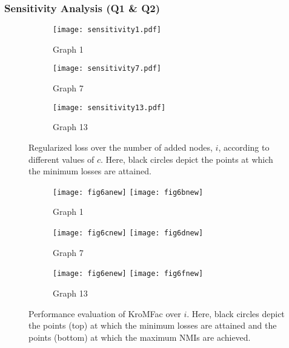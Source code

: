 \documentclass[format=acmsmall, review=false, screen=true]{acmart}
\begin{document}
\subsubsection{Sensitivity Analysis (Q1 \& Q2)}\label{syndata}
\begin{figure}[t!]
\begin{subfigure}[b]{.31\textwidth}
\centering
\texttt{[image: sensitivity1.pdf]}
\caption{Graph 1}\label{fig:sens1}
\end{subfigure}\hspace{1mm}
\begin{subfigure}[b]{.31\textwidth}
\centering
\texttt{[image: sensitivity7.pdf]}
\caption{Graph 7}\label{fig:sens7}
\end{subfigure}
\begin{subfigure}[b]{.31\textwidth}
\centering
\texttt{[image: sensitivity13.pdf]}
\caption{Graph 13}\label{fig:sens13}
\end{subfigure}\hspace{1mm}
\caption{Regularized loss over the number of added nodes, $i$, according to different values of $c$. Here, black circles depict the points at which the minimum losses are attained.} 
\label{fig:sens}
\end{figure}
\begin{figure}[tbh!]
\begin{subfigure}[b]{.31\textwidth}
\centering
\texttt{[image: fig6anew]}\hspace{1mm}
\texttt{[image: fig6bnew]}
\caption{Graph 1}\label{fig:6anew}
\end{subfigure}
\begin{subfigure}[b]{.31\textwidth}
\centering
\texttt{[image: fig6cnew]}\hspace{1mm}
\texttt{[image: fig6dnew]}
\caption{Graph 7}\label{fig:6bnew}
\end{subfigure}
\begin{subfigure}[b]{.31\textwidth}
\centering
\texttt{[image: fig6enew]}\hspace{1mm}
\texttt{[image: fig6fnew]}
\caption{Graph 13}\label{fig:6cnew}
\end{subfigure}
    \caption{Performance evaluation of \textsf{KroMFac} over $i$. Here, black circles depict the points (top) at which the minimum losses are attained and the points (bottom) at which the maximum NMIs are achieved. }
\label{fig:icomp}
\end{figure}
\end{document}
